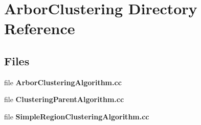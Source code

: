 \section{Arbor\+Clustering Directory Reference}
\label{dir_9ecea80760e8d850fdacf31073874bd8}
\subsection*{Files}
\begin{DoxyCompactItemize}
\item 
file {\bf Arbor\+Clustering\+Algorithm.\+cc}
\item 
file {\bf Clustering\+Parent\+Algorithm.\+cc}
\item 
file {\bf Simple\+Region\+Clustering\+Algorithm.\+cc}
\end{DoxyCompactItemize}
